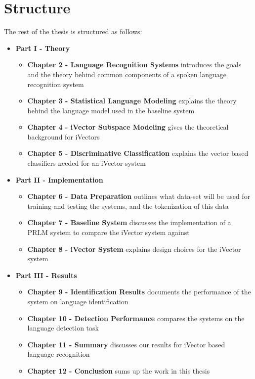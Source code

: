 \section{Structure}

The rest of the thesis is structured as follows:

\begin{itemize}
\item \textbf{Part I - Theory}
	\begin{itemize}
	\item \textbf{Chapter 2 - Language Recognition Systems} introduces the goals and the theory behind common components of a spoken language recognition system
	\item \textbf{Chapter 3 - Statistical Language Modeling}  explains the theory behind the language model used in the baseline system
	\item \textbf{Chapter 4 - iVector Subspace Modeling} gives the theoretical background for iVectors
	\item \textbf{Chapter 5 - Discriminative Classification} explains the vector based classifiers needed for an iVector system
	\end{itemize}
\item \textbf{Part II - Implementation}
	\begin{itemize}
	\item \textbf{Chapter 6 - Data Preparation} outlines what data-set will be used for training and testing the systems, and the tokenization of this data
	\item \textbf{Chapter 7 - Baseline System} discusses the implementation of a PRLM system to compare the iVector system against
	\item \textbf{Chapter 8 - iVector System} explains design choices for the iVector system
	\end{itemize}
\item \textbf{Part III - Results}
	\begin{itemize}
	\item \textbf{Chapter 9 - Identification Results} documents the performance of the system on language identification
	\item \textbf{Chapter 10 - Detection Performance} compares the systems on the language detection task
	\item \textbf{Chapter 11 - Summary} discusses our results for iVector based language recognition
	\item \textbf{Chapter 12 - Conclusion} sums up the work in this thesis
	\end{itemize}
\end{itemize}
